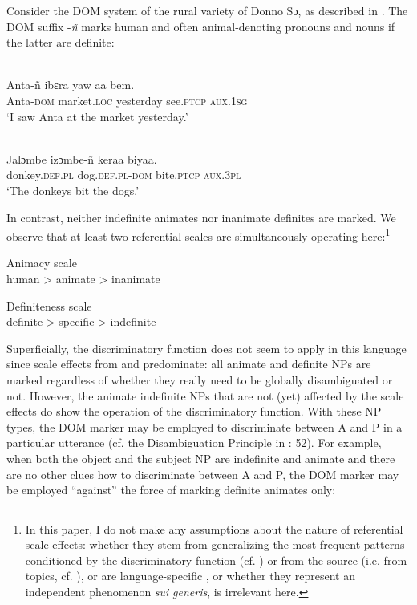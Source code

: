 \documentclass[output=paper]{langsci/langscibook}
\begin{document}
Consider the DOM system of the rural variety of Donno Sɔ, as described in \citet{Culy1995}. The DOM suffix \nobreakdash-\textit{ñ} marks human and often animal-denoting pronouns and nouns if the latter are definite:

\ea\label{ex:serzant:4}
\\
\gll   Anta-ñ     ibɛra     yaw     aa      bem.\\
     Anta-\textsc{dom}  market.\textsc{loc}  yesterday  see.\textsc{ptcp} \textsc{aux.1sg}\\
\glt ‘I saw Anta at the market yesterday.’
\z

\ea\label{ex:serzant:5}
\\
\gll  Jalɔmbe   izɔmbe-ñ     keraa     biyaa.\\
     donkey.\textsc{def.pl} dog.\textsc{def.pl-dom}   bite.\textsc{ptcp}   \textsc{aux.3pl}\\
\glt ‘The donkeys bit the dogs.’
\z

In contrast, neither indefinite animates nor inanimate definites are marked. We observe that at least two referential scales are simultaneously operating here:\footnote{In this paper, I do not make any assumptions about the nature of referential scale effects: whether they stem from generalizing the most frequent patterns conditioned by the discriminatory function (cf. \citealt{Aissen2003}) or from the source (i.e. from topics, cf. \citealt{DalrympleNikolaeva2011}), or are language-specific \citep{BickelEtAl2015}, or whether they represent an independent phenomenon \textit{sui} \textit{generis}, is irrelevant here.}

\newpage

\ea\label{ex:serzant:6}
Animacy scale\\
human > animate > inanimate
\z

\ea\label{ex:serzant:7}
Definiteness scale\\
definite > specific > indefinite
\z

Superficially, the discriminatory function does not seem to apply in this language since scale effects from  and  predominate: all animate and definite NPs are marked regardless of whether they really need to be globally disambiguated or not. However, the animate indefinite NPs that are not (yet) affected by the scale effects do show the operation of the discriminatory function. With these NP types, the DOM marker may be employed to discriminate between A and P in a particular utterance (cf. the Disambiguation Principle in \citealt{Culy1995}: 52). For example, when both the object and the subject NP are indefinite and animate and there are no other clues how to discriminate between A and P, the DOM marker may be employed “against” the force of marking definite animates only:
\end{document}
